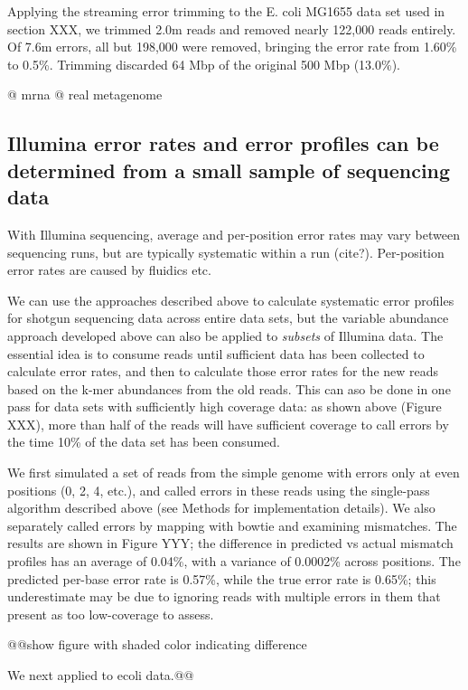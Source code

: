 \documentclass{article}
\begin{document}
Applying the streaming error trimming to the E. coli MG1655 data set
used in section XXX, we trimmed 2.0m reads and removed nearly 122,000
reads entirely.  Of 7.6m errors, all but 198,000 were removed,
bringing the error rate from 1.60\% to 0.5\%.  Trimming discarded 64
Mbp of the original 500 Mbp (13.0\%).

@ mrna
@ real metagenome

\subsection{Illumina error rates and error profiles can be determined from a
small sample of sequencing data}

With Illumina sequencing, average and per-position error rates may
vary between sequencing runs, but are typically systematic within a
run (cite?).  Per-position error rates are caused by fluidics etc.

We can use the approaches described above to calculate systematic
error profiles for shotgun sequencing data across entire data sets,
but the variable abundance approach developed above can also be
applied to {\em subsets} of Illumina data.  The essential idea is to
consume reads until sufficient data has been collected to calculate
error rates, and then to calculate those error rates for the new reads
based on the k-mer abundances from the old reads.  This can aso be
done in one pass for data sets with sufficiently high coverage data:
as shown above (Figure XXX), more than half of the reads will have
sufficient coverage to call errors by the time 10\% of the data set
has been consumed.

We first simulated a set of reads from the simple genome with errors
only at even positions (0, 2, 4, etc.), and called errors in these
reads using the single-pass algorithm described above (see Methods for
implementation details).  We also separately called errors by mapping
with bowtie and examining mismatches.  The results are shown in Figure
YYY; the difference in predicted vs actual mismatch profiles has an
average of 0.04\%, with a variance of 0.0002\% across positions.  The
predicted per-base error rate is 0.57\%, while the true error rate is
0.65\%; this underestimate may be due to ignoring reads with multiple
errors in them that present as too low-coverage to assess.

@@show figure with shaded color indicating difference

We next applied to ecoli data.@@
\end{document}

